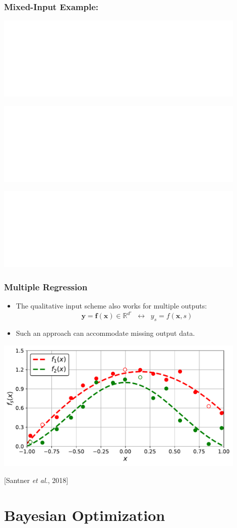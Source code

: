 \documentclass{beamer}
\newcommand{\R}{\mathbb{R}}
\newcommand{\vect}[1]{\boldsymbol{#1}}
\newcommand{\citeAY}[1]{
	\begin{flushright}
		{\footnotesize [#1]}
	\end{flushright}
}
\begin{document}
	\begin{frame}
		\frametitle{Mixed-Input Example: \only<3>{Combined Fit}}
		\begin{center}
			\includegraphics<1>[width=0.9\textwidth]{figures/06b_mixed_data_model.pdf}
			
			\includegraphics<2>[width=0.9\textwidth]{figures/06e_mixed_GPR_disjoint.pdf}
			
			\includegraphics<3>[width=0.9\textwidth]{figures/06d_mixed_GPR_fit.pdf}
		\end{center}
	\end{frame}
	
	\begin{frame}
		\frametitle{Multiple Regression}
		\begin{itemize}
			\item The qualitative input scheme also works for multiple outputs: $$\vect{y}=\mathbf{f}(\vect{x})\in\R^{d'}\;\;\longleftrightarrow\;\; y_s=f(\vect{x},s)$$
			\item Such an approach can accommodate missing output data.
		\end{itemize}
		\begin{center}
			\includegraphics[width=0.9\textwidth]{figures/06f_multiple_regression.pdf}
		\end{center}
		\citeAY{Santner \emph{et al.}, 2018}
	\end{frame}
	
	\section{Bayesian Optimization}
\end{document}
